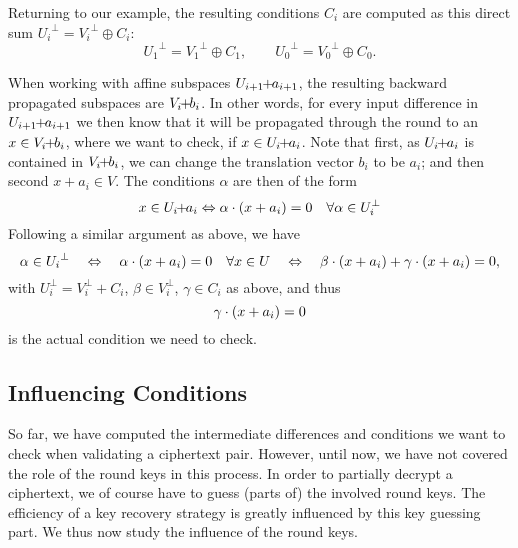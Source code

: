 Returning to our example, the resulting conditions $C_i$ are computed as this direct sum ${U_i}^\perp = {V_i}^\perp \oplus C_i$:
\begin{equation*}
    {U_1}^\perp = {V_1}^\perp \oplus C_1, \qquad {U_0}^\perp = {V_0}^\perp \oplus C_0.
\end{equation*}


When working with affine subspaces $U_{i+1} \!\! + \!\! a_{i+1}$, the resulting backward propagated subspaces are $V_i \!\! + \!\! b_i$.
In other words, for every input difference in $U_{i+1} \!\! + \!\! a_{i+1}$ we then know that it will be propagated through the round to an $x \in V_i \!\! + \!\! b_i$, where we want to check, if $x \in U_i \!\! + \!\! a_i$.
Note that first, as $U_i \!\! + \!\! a_i$ is contained in $V_i \!\! + \!\! b_i$, we can change the translation vector $b_i$ to be $a_i$; and then second $x + a_i \in V$.
The conditions $\alpha$ are then of the form
\begin{equation*}
    x \in U_i \!\! + \!\! a_i \Leftrightarrow \alpha \cdot (x + a_i) = 0 \quad \forall \alpha \in U_i^\perp
\end{equation*}
Following a similar argument as above, we have
\begin{equation*}
    \alpha \in {U_i}^\perp
    \quad \Leftrightarrow \quad
    \alpha \cdot (x + a_i) = 0 \quad \forall x \in U
    \quad \Leftrightarrow \quad
    \beta \cdot (x + a_i) + \gamma \cdot (x + a_i) = 0,
\end{equation*}
with $U_i^\perp = V_i^\perp + C_i$, $\beta \in V_i^\perp$, $\gamma \in C_i$ as above, and thus
\begin{equation*}
    \gamma \cdot (x + a_i) = 0
\end{equation*}
is the actual condition we need to check.

\subsection{Influencing Conditions}
So far, we have computed the intermediate differences and conditions we want to check when validating a ciphertext pair.
However, until now, we have not covered the role of the round keys in this process.
In order to partially decrypt a ciphertext, we of course have to guess (parts of) the involved round keys.
The efficiency of a key recovery strategy is greatly influenced by this key guessing part.
We thus now study the influence of the round keys.

